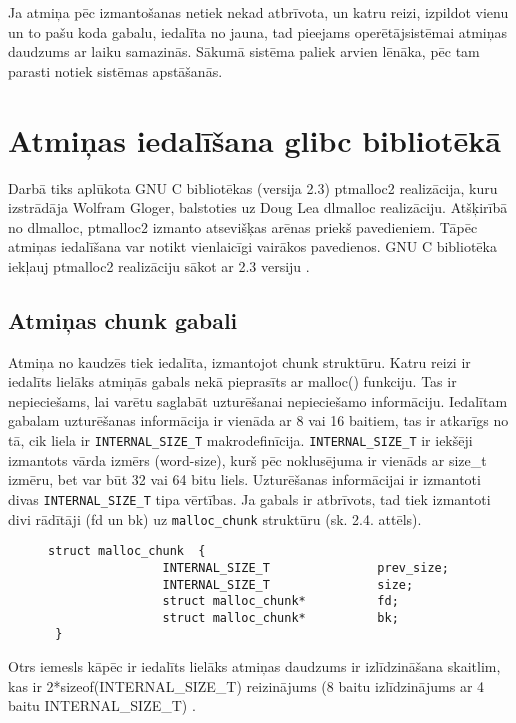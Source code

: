 Ja atmiņa pēc izmantošanas netiek nekad atbrīvota, un katru reizi, izpildot vienu un to pašu koda gabalu, iedalīta no jauna, tad pieejams operētājsistēmai atmiņas daudzums ar laiku samazinās.
Sākumā sistēma paliek arvien lēnāka, pēc tam parasti notiek sistēmas apstāšanās.






\section{Atmiņas iedalīšana glibc bibliotēkā}
Darbā tiks aplūkota GNU C bibliotēkas (versija 2.3) ptmalloc2 realizācija, kuru izstrādāja Wolfram Gloger, balstoties uz Doug Lea dlmalloc realizāciju. 
Atšķirībā no dlmalloc, ptmalloc2 izmanto atsevišķas arēnas priekš pavedieniem.
Tāpēc atmiņas iedalīšana var notikt vienlaicīgi vairākos pavedienos.
GNU C bibliotēka iekļauj ptmalloc2 realizāciju sākot ar 2.3 versiju \cite {MWIKI}. 

\subsection{Atmiņas chunk gabali}
Atmiņa no kaudzēs tiek iedalīta, izmantojot chunk struktūru.
Katru reizi ir iedalīts lielāks atmiņās gabals nekā pieprasīts ar malloc() funkciju.
Tas ir nepieciešams, lai varētu saglabāt uzturēšanai nepieciešamo informāciju. 
Iedalītam gabalam uzturēšanas informācija ir vienāda ar 8 vai 16 baitiem, tas ir atkarīgs no tā, cik liela ir \texttt{INTERNAL\_SIZE\_T} makrodefinīcija.
\texttt{INTERNAL\_SIZE\_T} ir iekšēji izmantots vārda izmērs (word-size), kurš pēc noklusējuma ir vienāds ar size\_t izmēru, bet var būt 32 vai 64 bitu liels.
Uzturēšanas informācijai ir izmantoti divas \texttt{INTERNAL\_SIZE\_T} tipa vērtības. Ja gabals ir atbrīvots, tad  tiek izmantoti divi rādītāji (fd un bk) uz \texttt{malloc\_chunk} struktūru (sk. 2.4. attēls). 


\begin{figure}[h]
\begin{lstlisting}
struct malloc_chunk  {
                INTERNAL_SIZE_T               prev_size;
                INTERNAL_SIZE_T               size;
                struct malloc_chunk*          fd;
                struct malloc_chunk*          bk;
 }
\end{lstlisting}
\caption{\textbf{\fontsize{11}{12}\selectfont {chunk gabala struktūra}}}
\end{figure}

Otrs iemesls kāpēc ir iedalīts lielāks atmiņas daudzums ir izlīdzināšana skaitlim, kas ir 2*sizeof(INTERNAL\_SIZE\_T) reizinājums (8 baitu izlīdzinājums ar 4 baitu INTERNAL\_SIZE\_T) \cite {MALLOC}.  



